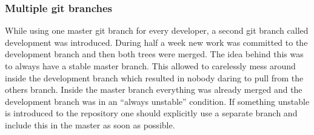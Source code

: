 \subsubsection{Multiple git branches}
While using one master git branch for every developer, a second git branch 
called development was introduced. During half a week new work was committed to the
development branch and then both trees were merged. The idea behind this was to
always have a stable master branch. This allowed to carelessly mess around
inside the development branch which resulted in nobody daring
to pull from the others branch. Inside the master branch everything was already merged and
the development branch was in an ``always unstable'' condition.
If something unstable is introduced to the repository one should explicitly use
a separate branch and include this in the master as soon as possible.

